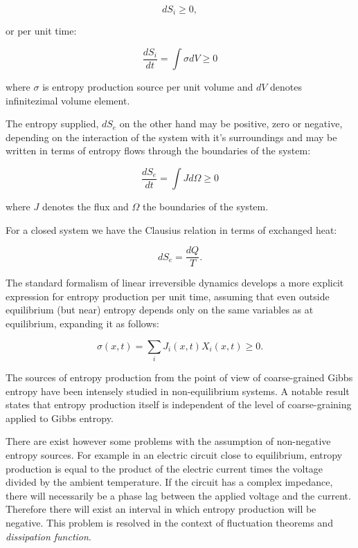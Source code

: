 \documentclass[a4paper,12pt]{article}
\begin{document}
\begin{equation}
  dS_i \geq 0,
\end{equation}

or per unit time:

\begin{equation}
  	\frac{dS_i}{dt}=\int \sigma dV \geq 0
\end{equation}

where $\sigma$ is entropy production source per unit volume and $dV$ denotes infinitezimal volume element.

The entropy supplied, $dS_e$ on the other hand may be positive, zero or negative, depending on the interaction of the system with it's surroundings and may be written in terms of entropy flows through the boundaries of the system:

\begin{equation}
  	\frac{dS_e}{dt}=\int J d\Omega \geq 0
\end{equation}

where $J$ denotes the flux and $\Omega$ the boundaries of the system.

For a closed system we have the Clausius relation in terms of exchanged heat:

\begin{equation}
  dS_e=\frac{dQ}{T}.
\end{equation}


The standard formalism of linear irreversible dynamics develops a more explicit expression for entropy production per unit time, assuming that even outside equilibrium (but near) entropy depends only on the same variables as at equilibrium, expanding it as follows: 

\begin{equation}
  \sigma(x,t) = \sum_i J_i(x,t) X_i(x,t) \geq 0.
\end{equation}


The sources of entropy production from the point of view of coarse-grained Gibbs entropy have been intensely studied in non-equilibrium systems. A notable result \cite{Gilbert:1999ff, Goldstein:1998ip} states that entropy production itself is independent of the level of coarse-graining applied to Gibbs entropy.

There are exist however some problems with the assumption of non-negative entropy sources.
For example in an electric circuit close to equilibrium, entropy production is equal to the product of the electric current times the voltage divided by the ambient temperature. If the circuit has a complex impedance, there will necessarily be a phase lag between the applied voltage and the current. Therefore there will exist an interval in which entropy production will be negative\cite{Evans:2241458}. 
This problem is resolved in the context of fluctuation theorems and \textit{dissipation function}.
\end{document}
